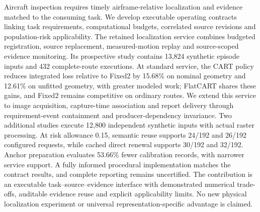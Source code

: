 Aircraft inspection requires timely airframe-relative localization and evidence matched to the consuming task. We develop executable operating contracts linking task requirements, computational budgets, correlated source revisions and population-risk applicability. The retained localization service combines budgeted registration, source replacement, measured-motion replay and source-scoped evidence monitoring. Its prospective study contains 13,824 synthetic episode inputs and 432 complete-route executions. At standard service, the CART policy reduces integrated loss relative to Fixed2 by 15.68\% on nominal geometry and 12.61\% on unfitted geometry, with greater modeled work; FlatCART shares these gains, and Fixed2 remains competitive on ordinary routes. We extend this service to image acquisition, capture-time association and report delivery through requirement-event containment and producer-dependency invariance. Two additional studies execute 12,800 independent synthetic inputs with actual raster processing. At risk allowance 0.15, semantic reuse supports 24/192 and 26/192 configured requests, while cached direct renewal supports 30/192 and 32/192. Anchor preparation evaluates 53.66\% fewer calibration records, with narrower service support. A fully informed procedural implementation matches the contract results, and complete reporting remains uncertified. The contribution is an executable task--source--evidence interface with demonstrated numerical trade-offs, auditable evidence reuse and explicit applicability limits. No new physical localization experiment or universal representation-specific advantage is claimed.
